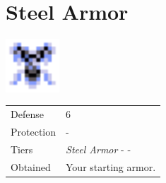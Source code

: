 \section{Steel Armor}
\label{armor:steel_armor}

\includegraphics[height=2cm,keepaspectratio]{./resources/armors/steelarmor}

\begin{longtable}{ l p{9cm} }
	Defense
	& 6
\\ %
	Protection
	& -
\\ %
	Tiers
	& \textit{Steel Armor} - \nameref{armor:noble_armor} - \nameref{armor:gaias_armor}
\\ %
	Obtained
	& Your starting armor.
\end{longtable}
